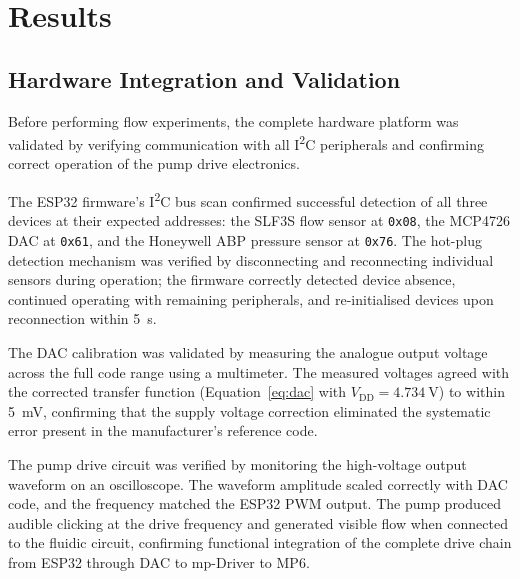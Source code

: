 
\chapter{Results}
\label{ch:results}

\ifpdf
    \graphicspath{{Chapter3/Figs/Raster/}{Chapter3/Figs/PDF/}{Chapter3/Figs/}}
\else
    \graphicspath{{Chapter3/Figs/Vector/}{Chapter3/Figs/}}
\fi

\section{Hardware Integration and Validation}

Before performing flow experiments, the complete hardware platform was validated by verifying communication with all I\textsuperscript{2}C peripherals and confirming correct operation of the pump drive electronics.

The ESP32 firmware's I\textsuperscript{2}C bus scan confirmed successful detection of all three devices at their expected addresses: the SLF3S flow sensor at \texttt{0x08}, the MCP4726 DAC at \texttt{0x61}, and the Honeywell ABP pressure sensor at \texttt{0x76}. The hot-plug detection mechanism was verified by disconnecting and reconnecting individual sensors during operation; the firmware correctly detected device absence, continued operating with remaining peripherals, and re-initialised devices upon reconnection within \SI{5}{\second}.

The DAC calibration was validated by measuring the analogue output voltage across the full code range using a multimeter. The measured voltages agreed with the corrected transfer function (Equation~\ref{eq:dac} with $V_{\text{DD}} = \SI{4.734}{\volt}$) to within \SI{5}{\milli\volt}, confirming that the supply voltage correction eliminated the systematic error present in the manufacturer's reference code.

The pump drive circuit was verified by monitoring the high-voltage output waveform on an oscilloscope. The waveform amplitude scaled correctly with DAC code, and the frequency matched the ESP32 PWM output. The pump produced audible clicking at the drive frequency and generated visible flow when connected to the fluidic circuit, confirming functional integration of the complete drive chain from ESP32 through DAC to mp-Driver to MP6.

